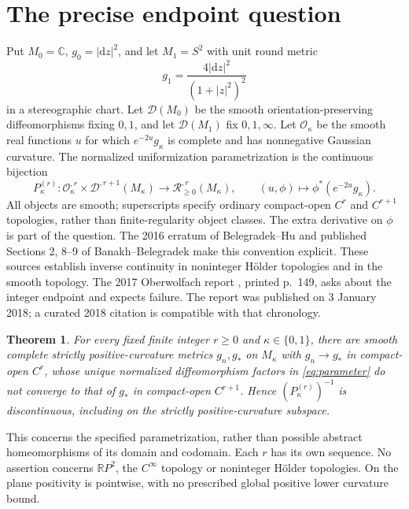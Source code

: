 \documentclass[11pt]{article}
\newtheorem{theorem}{Theorem}
\newcommand{\C}{\mathbb C}
\newcommand{\R}{\mathbb R}
\newcommand{\dd}{\mathrm d}
\begin{document}
\section{The precise endpoint question}
Put $M_0=\C$, $g_0=|\dd z|^2$, and let $M_1=S^2$ with unit round metric
\[
 g_1=\frac{4|\dd z|^2}{(1+|z|^2)^2}
\]
in a stereographic chart. Let $\mathcal D(M_0)$ be the smooth orientation-preserving diffeomorphisms fixing $0,1$, and let $\mathcal D(M_1)$ fix $0,1,\infty$. Let $\mathcal O_\kappa$ be the smooth real functions $u$ for which $e^{-2u}g_\kappa$ is complete and has nonnegative Gaussian curvature. The normalized uniformization parametrization is the continuous bijection
\begin{equation}\label{eq:parameter}
 P_\kappa^{(r)}:\mathcal O_\kappa^{,r}\times\mathcal D^{,r+1}(M_\kappa)
 \longrightarrow \mathcal R_{\geq0}^{,r}(M_\kappa),\qquad
 (u,\phi)\longmapsto \phi^*(e^{-2u}g_\kappa).
\end{equation}
All objects are smooth; superscripts specify ordinary compact-open $C^r$ and $C^{r+1}$ topologies, rather than finite-regularity object classes. The extra derivative on $\phi$ is part of the question. The 2016 erratum of Belegradek--Hu \cite{BH16} and published Sections 2, 8--9 of Banakh--Belegradek \cite{BB18} make this convention explicit. These sources establish inverse continuity in noninteger H\"older topologies and in the smooth topology. The 2017 Oberwolfach report \cite{OWR}, printed p.~149, asks about the integer endpoint and expects failure. The report was published on 3 January 2018; a curated 2018 citation is compatible with that chronology.

\begin{theorem}\label{thm:main}
For every fixed finite integer $r\geq0$ and $\kappa\in\{0,1\}$, there are smooth complete strictly positive-curvature metrics $g_n,g_*$ on $M_\kappa$ with $g_n\to g_*$ in compact-open $C^r$, whose unique normalized diffeomorphism factors in \eqref{eq:parameter} do not converge to that of $g_*$ in compact-open $C^{r+1}$. Hence $(P_\kappa^{(r)})^{-1}$ is discontinuous, including on the strictly positive-curvature subspace.
\end{theorem}

This concerns the specified parametrization, rather than possible abstract homeomorphisms of its domain and codomain. Each $r$ has its own sequence. No assertion concerns $\R P^2$, the $C^\infty$ topology or noninteger H\"older topologies. On the plane positivity is pointwise, with no prescribed global positive lower curvature bound.
\end{document}

